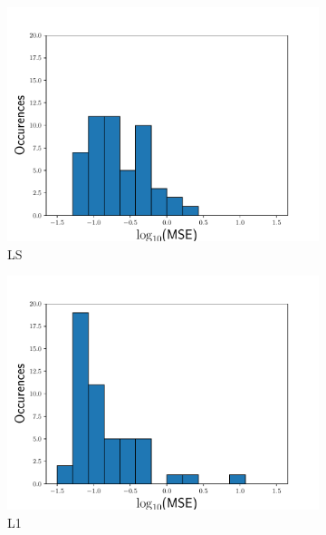 \documentclass[3p,computermodern,10pt]{elsarticle}
\begin{document}
\begin{figure}
\begin{center}
\begin{subfigure}[t]{0.32\textwidth}
\includegraphics[trim={0cm 0cm 0cm 0cm},clip,width=1.0\linewidth]{code/burgers/synapse_models/basis_study/results/LS_hist_MSE.pdf}
\caption{LS}
\end{subfigure}
\begin{subfigure}[t]{0.32\textwidth}
\includegraphics[trim={0cm 0cm 0cm 0cm},clip,width=1.0\linewidth]{code/burgers/synapse_models/basis_study/results/L1_hist_MSE.pdf}
\caption{L1}
\end{subfigure}
\begin{subfigure}[t]{0.32\textwidth}

\end{subfigure}
\end{center}
\end{figure}
\end{document}
